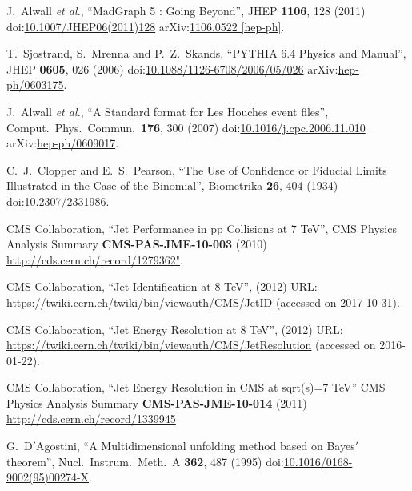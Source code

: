\begin{thebibliography}{99}

 J.~Alwall {\it et al.}, ``MadGraph 5 : Going Beyond'', JHEP {\bf 1106}, 128 (2011) doi:\href{https://doi.org/10.1007/JHEP06(2011)128}{10.1007/JHEP06(2011)128} arXiv:\href{https://arxiv.org/abs/1106.0522}{1106.0522 [hep-ph]}.

T.~Sjostrand, S.~Mrenna and P.~Z.~Skands, ``PYTHIA 6.4 Physics and Manual'', JHEP {\bf 0605}, 026 (2006) doi:\href{http://dx.doi.org/10.1088/1126-6708/2006/05/026}{10.1088/1126-6708/2006/05/026} arXiv:\href{https://arxiv.org/abs/hep-ph/0603175}{hep-ph/0603175}.
 
J.~Alwall {\it et al.}, ``A Standard format for Les Houches event files'', Comput.\ Phys.\ Commun.\  {\bf 176}, 300 (2007) doi:\href{http://dx.doi.org/10.1016/j.cpc.2006.11.010}{10.1016/j.cpc.2006.11.010} arXiv:\href{https://arxiv.org/abs/hep-ph/0609017}{hep-ph/0609017}.
 
C.~J.~Clopper and E.~S.~Pearson, ``The Use of Confidence or Fiducial Limits Illustrated in the Case of the Binomial'', Biometrika {\bf 26}, 404 (1934) doi:\href{http://www.jstor.org/stable/2331986}{10.2307/2331986}.

CMS Collaboration, ``Jet Performance in pp Collisions at 7 TeV'', CMS Physics Analysis Summary {\bf CMS-PAS-JME-10-003} (2010) \url{http://cds.cern.ch/record/1279362"}.

CMS Collaboration, ``Jet Identification at 8 TeV'', (2012) URL: \url{https://twiki.cern.ch/twiki/bin/viewauth/CMS/JetID} (accessed on 2017-10-31).


CMS Collaboration, ``Jet Energy Resolution at 8 TeV'', (2012) URL: \url{https://twiki.cern.ch/twiki/bin/viewauth/CMS/JetResolution} (accessed on 2016-01-22).

CMS Collaboration, ``Jet Energy Resolution in CMS at sqrt(s)=7 TeV'' CMS Physics Analysis Summary {\bf CMS-PAS-JME-10-014} (2011) \url {http://cds.cern.ch/record/1339945}

G.~D$'$Agostini, ``A Multidimensional unfolding method based on Bayes$'$ theorem'', Nucl.\ Instrum.\ Meth.\ A {\bf 362}, 487 (1995) doi:\href{http://dx.doi.org/10.1016/0168-9002(95)00274-X}{10.1016/0168-9002(95)00274-X}.


\end{thebibliography}
